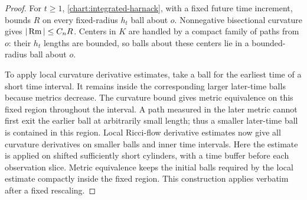 \begin{proof}
For $t\ge1$, \eqref{chart:integrated-harnack}, with a fixed future
time increment, bounds $R$ on every fixed-radius $h_t$ ball about
$o$.  Nonnegative bisectional curvature gives $|\operatorname{Rm}|\le C_nR$.
Centers in $K$ are handled by a compact family of paths from $o$:
their $h_t$ lengths are bounded, so balls about these centers lie
in a bounded-radius ball about $o$.

To apply local curvature derivative estimates, take a ball for the
earliest time of a short time interval.  It remains inside the
corresponding larger later-time balls because metrics decrease.
The curvature bound gives metric equivalence on this fixed region
throughout the interval.  A path measured in the later metric
cannot first exit the earlier ball at arbitrarily small length;
thus a smaller later-time ball is contained in this region.
Local Ricci-flow derivative estimates
\cite{Shi}\cite[Theorem~1.4]{Kotschwar} now give all curvature
derivatives on smaller balls and inner time intervals.
Here the estimate is applied on shifted sufficiently short cylinders,
with a time buffer before each observation slice.  Metric equivalence
keeps the initial balls required by the local estimate compactly
inside the fixed region.  This construction applies verbatim after
a fixed rescaling.


\end{proof}
